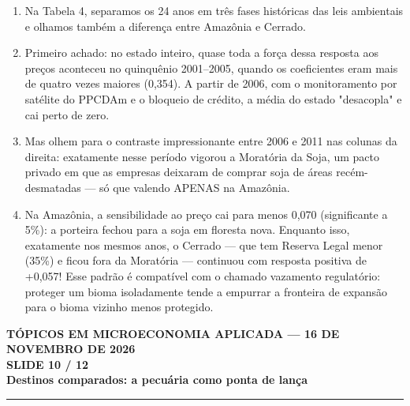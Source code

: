\documentclass[11pt,a4paper]{article}
\newcommand{\slidenum}{1}
\begin{document}
\vspace{1mm}
\begin{enumerate}[leftmargin=*,label=\textbf{(\arabic*)},itemsep=2.6mm,topsep=1mm]
    \item Na Tabela 4, separamos os 24 anos em três fases históricas das leis ambientais e olhamos também a diferença entre Amazônia e Cerrado.
    \item Primeiro achado: no estado inteiro, quase toda a força dessa resposta aos preços aconteceu no quinquênio 2001–2005, quando os coeficientes eram mais de quatro vezes maiores (0,354). A partir de 2006, com o monitoramento por satélite do PPCDAm e o bloqueio de crédito, a média do estado "desacopla" e cai perto de zero.
    \item Mas olhem para o contraste impressionante entre 2006 e 2011 nas colunas da direita: exatamente nesse período vigorou a Moratória da Soja, um pacto privado em que as empresas deixaram de comprar soja de áreas recém-desmatadas — só que valendo APENAS na Amazônia.
    \item Na Amazônia, a sensibilidade ao preço cai para menos 0,070 (significante a 5\%): a porteira fechou para a soja em floresta nova. Enquanto isso, exatamente nos mesmos anos, o Cerrado — que tem Reserva Legal menor (35\%) e ficou fora da Moratória — continuou com resposta positiva de +0,057! Esse padrão é compatível com o chamado vazamento regulatório: proteger um bioma isoladamente tende a empurrar a fronteira de expansão para o bioma vizinho menos protegido.
\end{enumerate}

\newpage

\renewcommand{\slidenum}{10}
\noindent
\begin{minipage}{\textwidth}
\begin{center}
{\color{cinza}\footnotesize\textbf{TÓPICOS EM MICROECONOMIA APLICADA --- 16 DE NOVEMBRO DE 2026}\\[1.2mm]}
{\color{cinza}\bfseries\Large SLIDE 10 / 12\\[1.5mm]}
{\color{verde}\bfseries\LARGE Destinos comparados: a pecuária como ponta de lança\\[2.5mm]}
\rule{\textwidth}{1pt}
\end{center}
\end{minipage}
\vspace{1.5mm}
\end{document}
